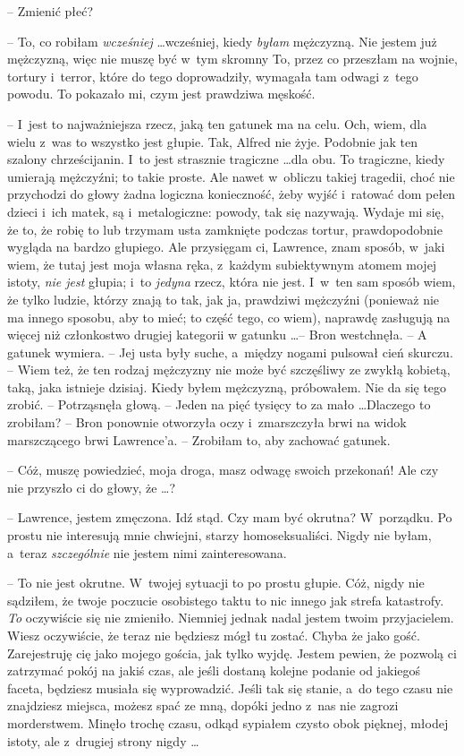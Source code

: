 \documentclass[oneside,polish,11pt,rmheadings]{mwbk}
\begin{document}
-- Zmienić płeć?  

-- To, co robiłam \textit{wcześniej } \ldots  wcześniej, kiedy \textit{byłam }mężczyzną. Nie jestem już mężczyzną, więc nie muszę być w~tym skromny To, przez co przeszłam na wojnie, tortury i~terror, które do tego doprowadziły, wymagała tam odwagi z~tego powodu. To pokazało mi, czym jest prawdziwa męskość. 

-- I~jest to najważniejsza rzecz, jaką ten gatunek ma na celu. Och, wiem, dla wielu z~was to wszystko jest głupie. Tak, Alfred nie żyje. Podobnie jak ten szalony chrześcijanin. I~to jest strasznie tragiczne \ldots  dla obu. To tragiczne, kiedy umierają mężczyźni; to takie proste. Ale nawet w~obliczu takiej tragedii, choć nie przychodzi do głowy żadna logiczna konieczność, żeby wyjść i~ratować dom pełen dzieci i~ich matek, są i~metalogiczne: powody, tak się nazywają. Wydaje mi się, że to, że robię to lub trzymam usta zamknięte podczas tortur, prawdopodobnie wygląda na bardzo głupiego. Ale przysięgam ci, Lawrence, znam sposób, w~jaki wiem, że tutaj jest moja własna ręka, z~każdym subiektywnym atomem mojej istoty, \textit{nie jest }głupia; i~to \textit{jedyna }rzecz, która nie jest. I~w~ten sam sposób wiem, że tylko ludzie, którzy znają to tak, jak ja, prawdziwi mężczyźni (ponieważ nie ma innego sposobu, aby to mieć; to część tego, co wiem), naprawdę zasługują na więcej niż członkostwo drugiej kategorii w gatunku \ldots  -- Bron westchnęła. -- A gatunek wymiera. -- Jej usta były suche, a~między nogami pulsował cień skurczu.  -- Wiem też, że ten rodzaj mężczyzny nie może być szczęśliwy ze zwykłą kobietą, taką, jaka istnieje dzisiaj. Kiedy byłem mężczyzną, próbowałem. Nie da się tego zrobić. -- Potrząsnęła głową. -- Jeden na pięć tysięcy to za mało \ldots   Dlaczego to zrobiłam? -- Bron ponownie otworzyła oczy i~zmarszczyła brwi na widok marszczącego brwi Lawrence'a. -- Zrobiłam to, aby zachować gatunek. 

-- Cóż, muszę powiedzieć, moja droga, masz odwagę swoich przekonań! Ale czy nie przyszło ci do głowy, że \ldots ? 

-- Lawrence, jestem zmęczona. Idź stąd. Czy mam być okrutna? W~porządku. Po prostu nie interesują mnie chwiejni, starzy homoseksualiści. Nigdy nie byłam, a~teraz \textit{szczególnie }nie jestem nimi zainteresowana.  

-- To nie jest okrutne. W~twojej sytuacji to po prostu głupie. Cóż, nigdy nie sądziłem, że twoje poczucie osobistego taktu to nic innego jak strefa katastrofy. \textit{To }oczywiście się nie zmieniło. Niemniej jednak nadal jestem twoim przyjacielem. Wiesz oczywiście, że teraz nie będziesz mógł tu zostać. Chyba że jako gość. Zarejestruję cię jako mojego gościa, jak tylko wyjdę. Jestem pewien, że pozwolą ci zatrzymać pokój na jakiś czas, ale jeśli dostaną kolejne podanie od jakiegoś faceta, będziesz musiała się wyprowadzić. Jeśli tak się stanie, a~do tego czasu nie znajdziesz miejsca, możesz spać ze mną, dopóki jedno z~nas nie zagrozi morderstwem. Minęło trochę czasu, odkąd sypiałem czysto obok pięknej, młodej istoty, ale z~drugiej strony nigdy \ldots  
\end{document}
